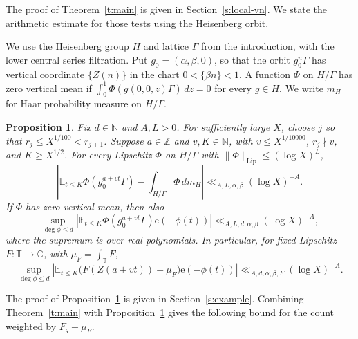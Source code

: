 \documentclass[12pt]{amsart}
\newcommand{\1}{\mathbf 1}
\newcommand{\e}{\mathrm e}
\newtheorem{proposition}[theorem]{Proposition}
\theoremstyle{definition}
\begin{document}
The proof of Theorem~\ref{t:main} is given in
Section~\ref{s:local-vn}.  We state the arithmetic estimate for
those tests using the Heisenberg orbit.

We use the Heisenberg group \(H\) and lattice \(\Gamma\) from the
introduction, with the lower central series filtration. Put
\(g_0=(\alpha,\beta,0)\), so that the orbit \(g_0^n\Gamma\) has vertical
coordinate \(\{Z(n)\}\) in the chart \(0<\{\beta n\}<1\).
A function \(\Phi\) on \(H/\Gamma\) has zero vertical mean if
\(\int_0^1\Phi(g(0,0,z)\Gamma)\,dz=0\) for every \(g\in H\).
We write \(m_H\) for Haar probability measure on \(H/\Gamma\).

\begin{proposition}\label{p:heisenberg-phase}
Fix $d\in\mathbb N$ and $A,L>0$. For sufficiently large $X$,
choose $j$ so that $r_j\leq X^{1/100}<r_{j+1}$.
Suppose $a\in\mathbb Z$ and $v,K\in\mathbb N$, with
$v\leq X^{1/10000}$, $r_j\nmid v$, and $K\geq X^{1/2}$.
For every Lipschitz $\Phi$ on $H/\Gamma$ with
$\|\Phi\|_{\mathrm{Lip}}\leq(\log X)^L$,
\begin{equation}\label{e:heisenberg-equidistribution}
 \left|\mathbb E_{t\leq K}\Phi(g_0^{a+vt}\Gamma)
       -\int_{H/\Gamma}\Phi\,dm_H\right|
 \ll_{A,L,\alpha,\beta}(\log X)^{-A}.
\end{equation}
If $\Phi$ has zero vertical mean, then also
\begin{equation}\label{e:heisenberg-twisted}
 \sup_{\deg\phi\leq d}
 \left|\mathbb E_{t\leq K}
   \Phi(g_0^{a+vt}\Gamma)\e(-\phi(t))\right|
 \ll_{A,L,d,\alpha,\beta}(\log X)^{-A},
\end{equation}
where the supremum is over real polynomials. In particular, for
fixed Lipschitz $F:\mathbb T\to\mathbb C$, with
$\mu_F=\int_{\mathbb T}F$,
\begin{equation}\label{e:heisenberg-centered}
 \sup_{\deg\phi\leq d}
 \left|\mathbb E_{t\leq K}
   \bigl(F(Z(a+vt))-\mu_F\bigr)\e(-\phi(t))\right|
 \ll_{A,d,\alpha,\beta,F}(\log X)^{-A}.
\end{equation}
\end{proposition}

The proof of Proposition~\ref{p:heisenberg-phase} is given in
Section~\ref{s:example}. Combining Theorem~\ref{t:main} with
Proposition~\ref{p:heisenberg-phase} gives the following bound for
the count weighted by \(F_q-\mu_F\).
\end{document}
